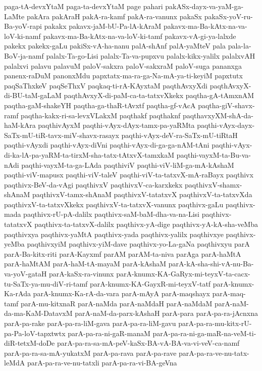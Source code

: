 {paga-tA-devxYtaM
paga-ta-devxYtaM
page
pahari
pakASx-dayx-va-yaM-ga-LaMte
pakAra
pakAraH
pakA-ra-kamf
pakA-ra-vanunx
pakaSx
pakaSx-yoV-ru-Ba-yoV-rapi
pakakx
pakavx-jaM-bU-Pa-lA-kAraM
pakavx-ma-Ba-kAtx-na-va-loV-ki-namf
pakavx-ma-Ba-kAtx-na-va-loV-ki-tamf
pakavx-vA-gi-ya-lalxde
pakekx
pakekx-gaLu
pakiSx-vA-ha-nanu
palA-shAnf
palA-yaMteV
pala
pala-la-BoV-ja-namf
palalx-Ta-go-Lisi
palalx-Ta-va-pupxvu
palalx-kikx-yalilx
palalxvAH
palalxvi
palavu
palavuM
paloV-sakxra
paloV-sakxraM
paloV-suga
pananxga
panenx-raDuM
panonxMdu
papxtatx-ma-ra-ga-Na-mA-ya-ti-keyiM
papxtutx
paqSaThxkeV
paqSeThxV
paqkaq-ti-rA-KAyxtaM
paqthAvxyXdi
paqthAvxyX-di-BU-taM-gaLaM
paqthAvxyX-di-paM-ca-ta-tatxvXkekx
paqtha-gA-tAmxnAM
paqtha-gaM-shakeYH
paqtha-ga-thaR-tAvxtf
paqtha-gf-vAcA
paqtha-giV-shavx-ramf
paqtha-kakx-ri-sa-levxVLakxM
paqthakf
paqthaknf
paqthavxyXM-shA-da-haM-kAra
paqthivAyxM
paqthi-vAyx-dAyx-tamx-pa-yaRMta
paqthi-vAyx-dayx-SaTx-mU-tiR-tavx-miV-shavx-rasayx
paqthi-vAyx-deV-ra-SaTx-mU-tiRtaH
paqthi-vAyxdi
paqthi-vAyx-diVni
paqthi-vAyx-di-ga-ga-nAM-tAni
paqthi-vAyx-di-ka-lA-pa-yaRM-ta-tirxM-sha-tatx-tAtxvX-tamxkaM
paqthi-vayxM-ta-Bu-va-nAdi
paqthi-vayxM-ta-ga-LAda
paqthiviV
paqthi-viV-liM-ga-mA-kAshaM
paqthi-viV-mapusx
paqthi-viV-taleV
paqthi-viV-ta-tatxvX-mA-raBayx
paqthivx
paqthivx-BeV-da-vAgi
paqthivxV
paqthivxV-ca-karxkekx
paqthivxV-shamx-shAnaM
paqthivxV-tamx-shAnaM
paqthivxV-tatatxvX
paqthivxV-ta-tatxvXda
paqthivxV-ta-tatxvXkekx
paqthivxV-ta-tatxvX-vanunx
paqthivx-gaLu
paqthivx-mada
paqthivx-rU-pA-dalilx
paqthivx-saM-baM-dha-va-na-Lisi
paqthivx-tatatxvX
paqthivx-ta-tatxvX-dalilx
paqthivx-yA-dige
paqthivx-yA-kA-sha-veMba
paqthivxya
paqthivx-yaMtA
paqthivx-yada
paqthivx-yalilx
paqthivxye
paqthivx-yeMba
paqthivxyiM
paqthivx-yiM-dave
paqthivx-yo-La-gaNa
paqthivxyu
parA
parA-Ba-kitx-riti
parA-Kayxmf
parAM
parAM-ta-niva
parAga
parA-haMtA
parA-haMtAM
parA-haM-tA-mayaM
parA-kAshaM
parA-kA-sha-shi-vA-nu-Ba-va-yoV-gataH
parA-kaSx-ra-vinunx
parA-knumx-KA-GaRyx-mi-teyxV-ta-cacx-tu-SaTx-ya-mu-diV-ri-tamf
parA-knumx-KA-GayxR-mi-teyxV-tatf
parA-knumx-Ka-rAda
parA-knumx-Ka-rA-da-vara
parA-mAyA
parA-maqshayx
parA-maq-tamf
parA-mu-kitxnaR
parA-naMda
parA-naMdaH
parA-naMdaM
parA-naM-da-ma-KaM-DatavxM
parA-naM-da-parx-kAshaH
parA-para
parA-pa-ra-jAcnxna
parA-pa-rake
parA-pa-ra-liM-gava
parA-pa-ra-liM-gavu
parA-pa-ra-mu-kitx-rU-pa-Pa-loV-tapxtwtx
parA-pa-ra-ni-gaR-manaM
parA-pa-ra-ni-ga-maR-na-veM-ti-diR-tetxM-doDe
parA-pa-ra-sa-mA-peV-kaSx-BA-vA-BA-va-vi-veV-ca-namf
parA-pa-ra-sa-mA-yukatxM
parA-pa-rava
parA-pa-rave
parA-pa-ra-ve-nu-tatx-leMdA
parA-pa-ra-ve-nu-tatxli
parA-pa-ra-vi-BA-geVna
}
